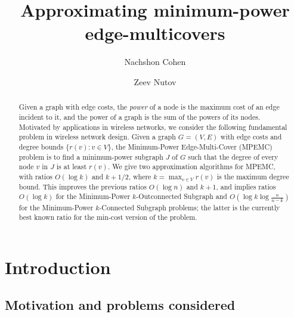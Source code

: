 \documentclass{llncs}
\begin{document}
\title{Approximating minimum-power edge-multicovers}

\author{Nachshon Cohen \and Zeev Nutov}

\maketitle

\begin{abstract}
Given a graph with edge costs, the {\em power} of a node is the
maximum cost of an edge incident to it, and the power of a graph is
the sum of the powers of its nodes. Motivated by applications in
wireless networks, we consider the following fundamental problem 
in wireless network design. Given a graph $G=(V,E)$ 
with edge costs and degree bounds $\{r(v):v \in V\}$, 
the {\sf Minimum-Power Edge-Multi-Cover} ({\sf MPEMC}) problem  is to find a
minimum-power subgraph $J$ of $G$ such that the degree of every node $v$ in $J$ 
is at least $r(v)$. We give two approximation algorithms for {\sf MPEMC},
with ratios $O(\log k)$ and $k+1/2$, where $k=\max_{v \in V} r(v)$ is the maximum 
degree bound.
This improves the previous ratios $O(\log n)$ and $k+1$, and implies ratios 
$O(\log k)$ for the {\sf Minimum-Power $k$-Outconnected Subgraph} and 
$O\left(\log k \log \frac{n}{n-k} \right)$ for the {\sf Minimum-Power $k$-Connected Subgraph}
problems; the latter is the currently best known ratio for the min-cost version
of the problem. 
\end{abstract}

\section{Introduction} \label{s:intro}

\subsection{Motivation and problems considered}
\end{document}
